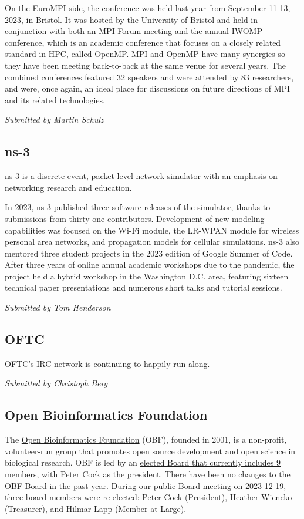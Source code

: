 \documentclass[a4paper]{report}
\begin{document}
On the EuroMPI side, the conference was held last year from September 11-13, 2023, in Bristol. It was hosted by the University of Bristol and held in conjunction with both an MPI Forum meeting and the annual IWOMP conference, which is an academic conference that focuses on a closely related standard in HPC, called OpenMP. MPI and OpenMP have many synergies so they have been meeting back-to-back at the same venue for several years. The combined conferences featured 32 speakers and were attended by 83 researchers, and were, once again, an ideal place for discussions on future directions of MPI and its related technologies.

{\em Submitted by Martin Schulz}

\subsection{ns-3}

\href{https://www.nsnam.org}{ns-3} is a discrete-event, packet-level network simulator with an emphasis on networking research and education.

In 2023, ns-3 published three software releases of the simulator, thanks to submissions from thirty-one contributors.  Development of new modeling capabilities was focused on the Wi-Fi module, the LR-WPAN module for wireless personal area networks, and propagation models for cellular simulations.  ns-3 also mentored three student projects in the 2023 edition of Google Summer of Code.  After three years of online annual academic workshops due to the pandemic, the project held a hybrid workshop in the Washington D.C. area, featuring sixteen technical paper presentations and numerous short talks and tutorial sessions.

{\em Submitted by Tom Henderson}

\subsection{OFTC}

\href{https://oftc.net/}{OFTC}'s IRC network is continuing to happily run along.

{\em Submitted by Christoph Berg}

\subsection{Open Bioinformatics Foundation}

The \href{https://www.open-bio.org/}{Open Bioinformatics Foundation} (OBF), founded in 2001, is a non-profit, volunteer-run group that promotes open source development and open science in biological research. OBF is led by an \href{https://open-bio.org/board/ }{elected Board that currently includes 9 members}, with Peter Cock as the president. There have been no changes to the OBF Board in the past year.  During our public Board meeting on 2023-12-19, three board members were re-elected: Peter Cock (President), Heather Wiencko (Treasurer), and Hilmar Lapp (Member at Large).
\end{document}
